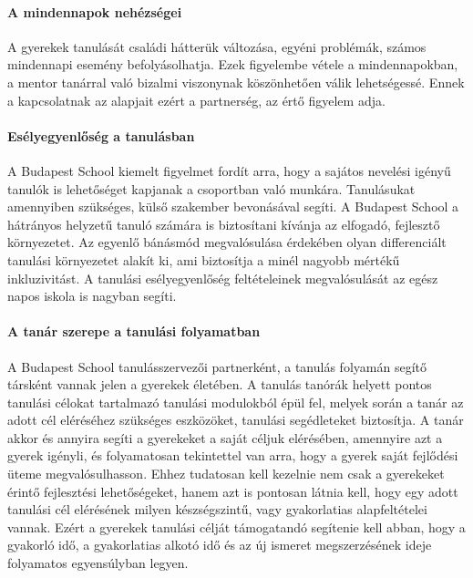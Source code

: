 \paragraph{A mindennapok
      nehézségei}

A gyerekek tanulását családi hátterük változása, egyéni problémák,
számos mindennapi esemény befolyásolhatja. Ezek figyelembe vétele a
mindennapokban, a mentor tanárral való bizalmi viszonynak köszönhetően
válik lehetségessé. Ennek a kapcsolatnak az alapjait ezért a partnerség,
az értő figyelem adja.

\paragraph{Esélyegyenlőség a
      tanulásban}

A Budapest School kiemelt figyelmet fordít arra, hogy a sajátos nevelési
igényű tanulók is lehetőséget kapjanak a csoportban való munkára.
Tanulásukat amennyiben szükséges, külső szakember bevonásával segíti. A
Budapest School a hátrányos helyzetű tanuló számára is biztosítani
kívánja az elfogadó, fejlesztő környezetet. Az egyenlő bánásmód
megvalósulása érdekében olyan differenciált tanulási környezetet alakít
ki, ami biztosítja a minél nagyobb mértékű inkluzivitást. A tanulási
esélyegyenlőség feltételeinek megvalósulását az egész napos iskola is
nagyban segíti.

\paragraph{A tanár szerepe a tanulási
      folyamatban}

A Budapest School tanulásszervezői partnerként, a tanulás folyamán
segítő társként vannak jelen a gyerekek életében. A tanulás tanórák
helyett pontos tanulási célokat tartalmazó tanulási modulokból épül fel,
melyek során a tanár az adott cél eléréséhez szükséges eszközöket,
tanulási segédleteket biztosítja. A tanár akkor és annyira segíti a
gyerekeket a saját céljuk elérésében, amennyire azt a gyerek igényli, és
folyamatosan tekintettel van arra, hogy a gyerek saját fejlődési üteme
megvalósulhasson. Ehhez tudatosan kell kezelnie nem csak a gyerekeket
érintő fejlesztési lehetőségeket, hanem azt is pontosan látnia kell,
hogy egy adott tanulási cél elérésének milyen készségszintű, vagy
gyakorlatias alapfeltételei vannak. Ezért a gyerekek tanulási célját
támogatandó segítenie kell abban, hogy a gyakorló idő, a gyakorlatias
alkotó idő és az új ismeret megszerzésének ideje folyamatos egyensúlyban
legyen.

